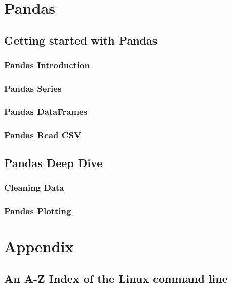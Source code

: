 \documentclass[14pt,fleqn]{extbook} %
\begin{document}
\chapter{Pandas}
\section{Getting started with Pandas}

\subsection{Pandas Introduction}

\subsection{Pandas Series}

\subsection{Pandas DataFrames}

\subsection{Pandas Read CSV}

%
\section{Pandas Deep Dive}

\subsection{Cleaning Data}

\subsection{Pandas Plotting}





\chapter{Appendix}
\section{An A-Z Index of the Linux command line}

\end{document}

